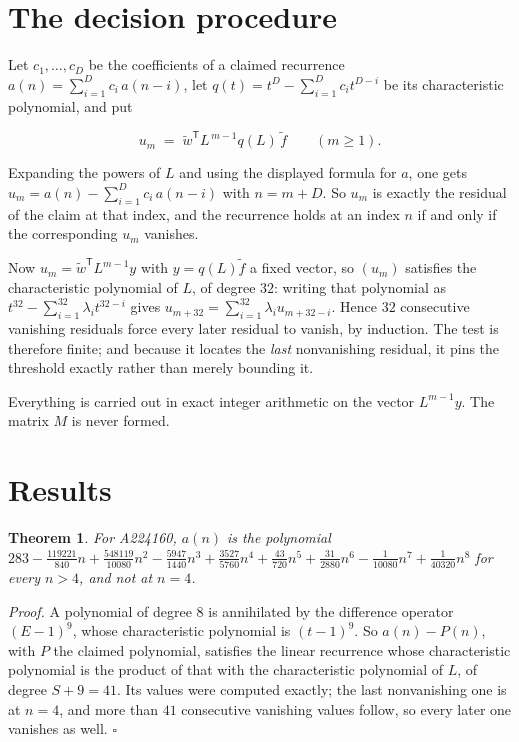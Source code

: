 \documentclass[11pt]{article}
\newtheorem{theorem}{Theorem}
\theoremstyle{definition}
\begin{document}
\section{The decision procedure}

Let $c_1,\dots,c_D$ be the coefficients of a claimed recurrence $a(n) = \sum_{i=1}^{D} c_i\,a(n-i)$, let $q(t) = t^{D} - \sum_{i=1}^{D} c_i t^{D-i}$ be its characteristic polynomial, and put

\[u_m \;=\; \tilde w^{\mathsf T} L^{\,m-1} q(L)\,\tilde f \qquad (m \ge 1).\]

Expanding the powers of $L$ and using the displayed formula for $a$, one gets $u_m = a(n) - \sum_{i=1}^{D} c_i\,a(n-i)$ with $n = m + D$. So $u_m$ is exactly the residual of the claim at that index, and the recurrence holds at an index $n$ if and only if the corresponding $u_m$ vanishes.

Now $u_m = \tilde w^{\mathsf T} L^{m-1} y$ with $y = q(L)\tilde f$ a fixed vector, so $(u_m)$ satisfies the characteristic polynomial of $L$, of degree $32$: writing that polynomial as $t^{32} - \sum_{i=1}^{32} \lambda_i t^{32-i}$ gives $u_{m+32} = \sum_{i=1}^{32} \lambda_i u_{m+32-i}$. Hence $32$ consecutive vanishing residuals force every later residual to vanish, by induction. The test is therefore finite; and because it locates the {\itshape last} nonvanishing residual, it pins the threshold exactly rather than merely bounding it.

Everything is carried out in exact integer arithmetic on the vector $L^{m-1}y$. The matrix $M$ is never formed.

\section{Results}

\begin{theorem} For A224160, $a(n)$ is the polynomial $283 - \frac{119221}{840}n + \frac{548119}{10080}n^{2} - \frac{5947}{1440}n^{3} + \frac{3527}{5760}n^{4} + \frac{43}{720}n^{5} + \frac{31}{2880}n^{6} - \frac{1}{10080}n^{7} + \frac{1}{40320}n^{8}$ for every $n > 4$, and not at $n = 4$.\end{theorem}

{\itshape Proof.} A polynomial of degree $8$ is annihilated by the difference operator $(E-1)^{9}$, whose characteristic polynomial is $(t-1)^{9}$. So $a(n) - P(n)$, with $P$ the claimed polynomial, satisfies the linear recurrence whose characteristic polynomial is the product of that with the characteristic polynomial of $L$, of degree $S + 9 = 41$. Its values were computed exactly; the last nonvanishing one is at $n = 4$, and more than $41$ consecutive vanishing values follow, so every later one vanishes as well. $\square$
\end{document}
